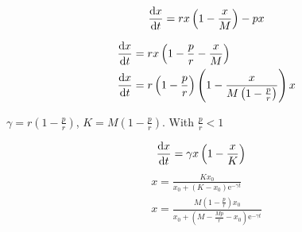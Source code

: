 \begin{equation}
	\frac{\mathrm{d} x}{{\mathrm{d} t}}=rx\left(1-\frac{x}{M}\right)-px
\end{equation}

\begin{align}
\frac{\mathrm{d} x}{{\mathrm{d} t}}&=rx\left(1-\frac{p}{r}-\frac{x}{M}\right) \\
\frac{\mathrm{d} x}{{\mathrm{d} t}}&=r\left(1-\frac{p}{r}\right)\left(1-\frac{x}{M\left(1-\frac{p}{r}\right)}\right)x
\end{align}

$\gamma=r\left(1-\frac{p}{r}\right)$, $K=M\left(1-\frac{p}{r}\right)$. With $\frac{p}{r}<1$

\begin{align}
	\frac{\mathrm{d} x}{{\mathrm{d} t}}&=\gamma x\left(1-\frac{x}{K}\right)
\end{align}
\begin{align}
	x=\frac{Kx_0}{x_0+\left(K-x_0\right)\mathrm{e}^{-\gamma t}}\\
	x=\frac{M\left(1-\frac{p}{r}\right)x_0}{x_0+\left(M-\frac{Mp}{r}-x_0\right)\mathrm{e}^{-\gamma t}}
\end{align}
